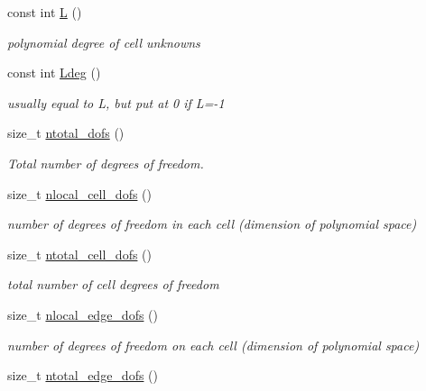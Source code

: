\begin{DoxyCompactItemize}
\mbox{\label{classHArDCore2D_1_1HybridCore_af5aea2e23e91c582d8c8189a5bc7ae96}} 
const int \hyperlink{classHArDCore2D_1_1HybridCore_af5aea2e23e91c582d8c8189a5bc7ae96}{L} ()
\begin{DoxyCompactList}\small\item\em polynomial degree of cell unknowns \end{DoxyCompactList}\item 
\mbox{\label{classHArDCore2D_1_1HybridCore_abc772d1adc056fb4bf725f39c92edbb5}} 
const int \hyperlink{classHArDCore2D_1_1HybridCore_abc772d1adc056fb4bf725f39c92edbb5}{Ldeg} ()
\begin{DoxyCompactList}\small\item\em usually equal to L, but put at 0 if L=-\/1 \end{DoxyCompactList}\item 
size\+\_\+t \hyperlink{group__HybridCore_ga728e5b5aa3675a64e7dbc593ed9761f8}{ntotal\+\_\+dofs} ()
\begin{DoxyCompactList}\small\item\em Total number of degrees of freedom. \end{DoxyCompactList}\item 
size\+\_\+t \hyperlink{group__HybridCore_ga6faceb46cc896cd6d82a821828518730}{nlocal\+\_\+cell\+\_\+dofs} ()
\begin{DoxyCompactList}\small\item\em number of degrees of freedom in each cell (dimension of polynomial space) \end{DoxyCompactList}\item 
size\+\_\+t \hyperlink{group__HybridCore_gaf97e3efcc37ac51074c7136af3ca517b}{ntotal\+\_\+cell\+\_\+dofs} ()
\begin{DoxyCompactList}\small\item\em total number of cell degrees of freedom \end{DoxyCompactList}\item 
size\+\_\+t \hyperlink{group__HybridCore_ga6a45e5ff09d21b18874e1446cd9de9bc}{nlocal\+\_\+edge\+\_\+dofs} ()
\begin{DoxyCompactList}\small\item\em number of degrees of freedom on each cell (dimension of polynomial space) \end{DoxyCompactList}\item 
size\+\_\+t \hyperlink{group__HybridCore_ga49a703b6786215e5acf8bb59ecdbc9ea}{ntotal\+\_\+edge\+\_\+dofs} ()

\end{DoxyCompactItemize}
